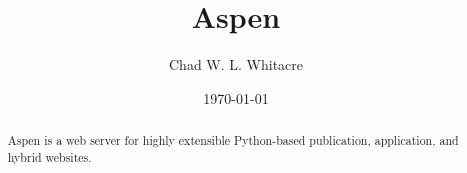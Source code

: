 \documentclass{manual}
\title{Aspen}
\author{Chad W. L. Whitacre}
\date\today
\begin{document}
\maketitle

\begin{abstract}

\noindent
Aspen is a web server for highly extensible Python-based publication,
application, and hybrid websites.

\end{abstract}







\end{document}
